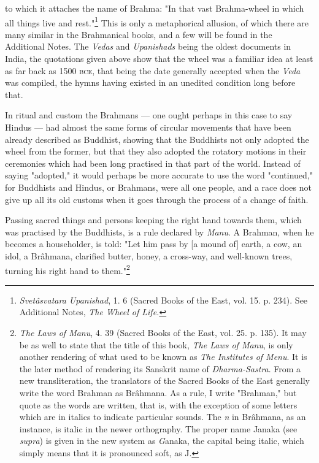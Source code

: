 \documentclass[a4paper, 11pt, oneside, polutonikogreek, english]{article}
\begin{document}
to which it attaches the name of Brahma: "In that vast Brahma-wheel in which all things live and rest."\footnote{\emph{Svetâsvatara Upanishad}, 1. 6 (Sacred Books of the East, vol. 15. p. 234). See Additional Notes, \emph{The Wheel of Life.}} This is only a metaphorical allusion, of which there are many similar in the Brahmanical books, and a few will be found in the Additional Notes. The \emph{Vedas} and \emph{Upanishads} being the oldest documents in India, the quotations given above show that the wheel was a familiar idea at least as far back as 1500 \textsc{bce}, that being the date generally accepted when the \emph{Veda} was compiled, the hymns having existed in an unedited condition long before that.

In ritual and custom the Brahmans --- one ought perhaps in this case to say Hindus --- had almost the same forms of circular movements that have been already described as Buddhist, showing that the Buddhists not only adopted the wheel from the former, but that they also adopted the rotatory motions in their ceremonies which had been long practised in that part of the world. Instead of saying "adopted," it would perhaps be more accurate to use the word "continued," for Buddhists and Hindus, or Brahmans, were all one people, and a race does not give up all its old customs when it goes through the process of a change of faith.

Passing sacred things and persons keeping the right hand towards them, which was practised by the Buddhists, is a rule declared by \emph{Manu}. A Brahman, when he becomes a householder, is told: "Let him pass by [a mound of] earth, a cow, an idol, a Brâhmana, clarified butter, honey, a cross-way, and well-known trees, turning his right hand to them."\footnote{\emph{The Laws of Manu}, 4. 39 (Sacred Books of the East, vol. 25. p. 135). It may be as well to state that the title of this book, \emph{The Laws of Manu}, is only another rendering of what used to be known as \emph{The Institutes of Menu}. It is the later method of rendering its Sanskrit name of \emph{Dharma-Sastra}. From a new transliteration, the translators of the Sacred Books of the East generally write the word Brahman as Brâhmana. As a rule, I write "Brahman," but quote as the words are written, that is, with the exception of some letters which are in italics to indicate particular sounds. The \emph{n} in Brâhmana, as an instance, is italic in the newer orthography. The proper name Janaka (see \emph{supra}) is given in the new system as \emph{G}anaka, the capital being italic, which simply means that it is pronounced soft, as J.}
\end{document}
